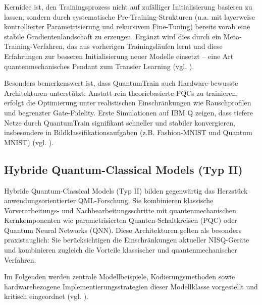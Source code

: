 Kernidee ist, den Trainingsprozess nicht auf zufälliger Initialisierung basieren zu lassen, sondern durch systematische Pre-Training-Strukturen (u.a. mit layerweise kontrollierter Parametrisierung und rekursivem Fine-Tuning) bereits vorab eine stabile Gradientenlandschaft zu erzeugen. Ergänzt wird dies durch ein Meta-Training-Verfahren, das aus vorherigen Trainingsläufen lernt und diese Erfahrungen zur besseren Initialisierung neuer Modelle einsetzt – eine Art quantenmechanisches Pendant zum Transfer Learning (vgl.  \cite{liuQuantumTrainRethinkingHybrid2024}).

Besonders bemerkenswert ist, dass QuantumTrain auch Hardware-bewusste Architekturen unterstützt: Anstatt rein theoriebasierte PQCs zu trainieren, erfolgt die Optimierung unter realistischen Einschränkungen wie Rauschprofilen und begrenzter Gate-Fidelity. Erste Simulationen auf IBM Q zeigen, dass tiefere Netze durch QuantumTrain signifikant schneller und stabiler konvergieren, insbesondere in Bildklassifikationsaufgaben (z.B. Fashion-MNIST und Quantum MNIST) (vgl. \cite{liuQuantumTrainRethinkingHybrid2024}).



\subsection{Hybride Quantum-Classical Models (Typ II)}
Hybride Quantum-Classical Models (Typ II) bilden gegenwärtig das Herzstück anwendungsorientierter QML-Forschung. Sie kombinieren klassische Vorverarbeitungs- und Nachbearbeitungsschritte mit quantenmechanischen Kernkomponenten wie parametrisierten Quanten-Schaltkreisen (PQC) oder Quantum Neural Networks (QNN). Diese Architekturen gelten als besonders praxistauglich: Sie berücksichtigen die Einschränkungen aktueller NISQ-Geräte und kombinieren zugleich die Vorteile klassischer und quantenmechanischer Verfahren.

Im Folgenden werden zentrale Modellbeispiele, Kodierungsmethoden sowie hardwarebezogene Implementierungsstrategien dieser Modellklasse vorgestellt und kritisch eingeordnet (vgl. \cite{peral-garciaSystematicLiteratureReview2024}).


